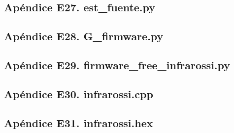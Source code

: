 \subsection{\footnotesize Ap\'endice E27. est\_fuente.py}\label{app:appE27}
 


\subsection{\footnotesize Ap\'endice E28. G\_firmware.py}\label{app:appE28}
  

\subsection{\footnotesize Ap\'endice E29. firmware\_free\_infrarossi.py}\label{app:appE29}
 

\subsection{\footnotesize Ap\'endice E30. infrarossi.cpp}\label{app:appE30}
 

\subsection{\footnotesize Ap\'endice E31. infrarossi.hex}\label{app:appE31}
 

